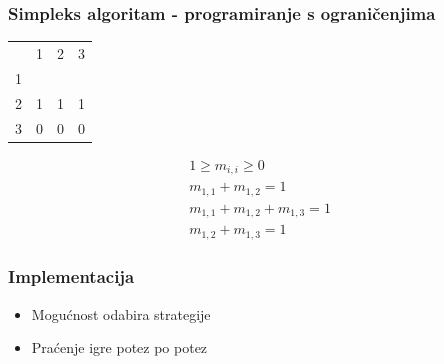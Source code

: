\documentclass{beamer}
\begin{document}
    \begin{frame}[t]
        \frametitle{Simpleks algoritam - programiranje s ograničenjima}

        \begin{table}[ht]
            \centering
            \begin{tabular}{llll}
                                   & 1                      & 2                      & 3                      \\ \cline{2-4}
            \multicolumn{1}{l|}{1} & \multicolumn{1}{l|}{}  & \multicolumn{1}{l|}{}  & \multicolumn{1}{l|}{}  \\ \cline{2-4}
            \multicolumn{1}{l|}{2} & \multicolumn{1}{l|}{1} & \multicolumn{1}{l|}{1} & \multicolumn{1}{l|}{1} \\ \cline{2-4}
            \multicolumn{1}{l|}{3} & \multicolumn{1}{l|}{0} & \multicolumn{1}{l|}{0} & \multicolumn{1}{l|}{0}  \\ \cline{2-4}
            \end{tabular}
        \end{table}

        \begin{gather*}
            1 \ge m_{i, i} \ge 0 \\
            m_{1, 1} + m_{1, 2} = 1 \\
            m_{1, 1} + m_{1, 2}+ m_{1, 3} = 1 \\
            m_{1, 2} + m_{1, 3} = 1
        \end{gather*}

    \end{frame}
    
        \begin{frame}[t]
        \frametitle{Implementacija}
        
         \begin{figure}
            \centering
        \end{figure}

      \begin{itemize}
            \item<2-> Mogućnost odabira strategije
            \item<3-> Praćenje igre potez po potez
        \end{itemize}
    \end{frame}
\end{document}
